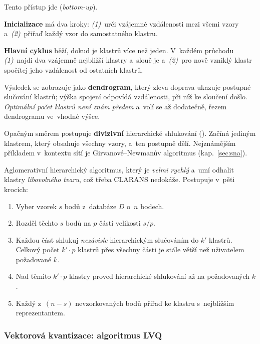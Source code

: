 \documentclass[11pt,a4paper]{article}
\theoremstyle{definition}
\begin{document}
\begin{defbox}
Tento přístup jde  (\emph{bottom-up}).

\textbf{Inicializace} má dva kroky: \emph{(1)}~urči vzájemné vzdálenosti mezi všemi vzory
a~\emph{(2)}~přiřaď každý vzor do samostatného klastru.

\textbf{Hlavní cyklus} běží, dokud je klastrů více než jeden. V~každém průchodu
\emph{(1)}~najdi dva vzájemně nejbližší klastry a~slouč je a~\emph{(2)}~pro nově vzniklý
klastr spočítej jeho vzdálenost od ostatních klastrů.

Výsledek se zobrazuje jako \textbf{dendrogram}, který zleva doprava ukazuje postupné slučování
klastrů; výška spojení odpovídá vzdálenosti, při níž ke sloučení došlo. \emph{Optimální počet
klastrů není znám předem} a~volí se až dodatečně, řezem dendrogramu ve~vhodné výšce.
\end{defbox}

Opačným směrem postupuje \textbf{divizivní} hierarchické shlukování ().
Začíná jediným klastrem, který obsahuje všechny vzory, a~ten postupně dělí. Nejznámějším
příkladem v~kontextu sítí je Girvanové--Newmanův algoritmus (kap.~\ref{sec:sna}).

\begin{defbox}
Aglomerativní hierarchický algoritmus, který je \emph{velmi rychlý} a~umí odhalit klastry
\emph{libovolného tvaru}, což třeba CLARANS nedokáže. Postupuje v~pěti krocích:
\begin{enumerate}
\item Vyber vzorek $s$ bodů z~databáze $D$ o~$n$ bodech.
\item Rozděl těchto $s$ bodů na $p$ částí velikosti $s/p$.
\item Každou část shlukuj \emph{nezávisle} hierarchickým slučováním do $k'$ klastrů. Celkový
      počet $k'\cdot p$ klastrů přes všechny části je stále větší než uživatelem požadované
      $k$.
\item Nad těmito $k'\cdot p$ klastry proveď hierarchické shlukování až na požadovaných $k$.
\item Každý z~$(n-s)$ nevzorkovaných bodů přiřaď ke klastru s~nejbližším reprezentantem.
\end{enumerate}
\end{defbox}

\subsubsection{Vektorová kvantizace: algoritmus LVQ}
\end{document}

